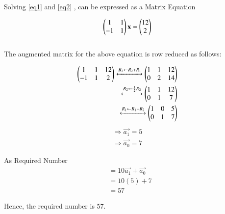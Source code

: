 \documentclass[journal,12pt,twocolumn]{IEEEtran}
\begin{document}
 Solving  \ref{eq1} and \ref{eq2} , can be expressed as a Matrix Equation

 \begin{align}
    \begin{pmatrix}
    1 & 1 \\-1 & 1\end{pmatrix}\mathbf{x} = \begin{pmatrix}12\\2\end{pmatrix}
 \end{align}
 \\
The augmented matrix for the above equation
is row reduced as follows:

\begin{align}
\begin{pmatrix}1&1&12\\-1&1&2\end{pmatrix}\xleftrightarrow{R_2\leftarrow R_2+ R_1} \begin{pmatrix}1&1&12\\0&2&14\end{pmatrix}
\\
\xleftrightarrow{R_2\leftarrow \frac{1}{2}R_2} \begin{pmatrix}1&1&12 \\ 0&1&7\end{pmatrix}
\\
\xleftrightarrow{R_1 \leftarrow R_1-R_2}
\begin{pmatrix}1&0&5\\0&1&7\end{pmatrix}
\end{align}
\begin{align}
    \Rightarrow \vec{a_1}=5\\
    \Rightarrow \vec{a_0}=7
\end{align}
 
  As Required Number 
    \begin{align}
        &=10\vec{a_1}+\vec{a_0}\\
        &=10(5)+7\\
        &=57
    \end{align}

  Hence, the required number is $57$.
\end{document}
